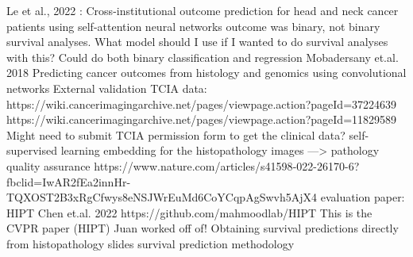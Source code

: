 \documentclass{article}%
\begin{document}
%
Le et al., 2022 : Cross{-}institutional outcome prediction for head and neck cancer patients using self{-}attention neural networks%
\newline%
\newline%
%
outcome was binary, not binary survival analyses. What model should I use if I wanted to do survival analyses with this? Could do both binary classification and regression%
\newline%
\newline%
%
Mobadersany et.al. 2018 Predicting cancer outcomes from histology and genomics using convolutional networks%
\newline%
\newline%
%
External validation TCIA data:%
\newline%
\newline%
%
https://wiki.cancerimagingarchive.net/pages/viewpage.action?pageId=37224639%
\newline%
\newline%
%
https://wiki.cancerimagingarchive.net/pages/viewpage.action?pageId=11829589%
\newline%
\newline%
%
Might need to submit TCIA permission form to get the clinical data?%
\newline%
\newline%
%
self{-}supervised learning embedding for the histopathology images —> pathology quality assurance%
\newline%
\newline%
%
https://www.nature.com/articles/s41598{-}022{-}26170{-}6?fbclid=IwAR2fEa2innHr{-}TQXOST2B3xRgCfwys8eNSJWrEuMd6CoYCqpAgSwvh5AjX4%
\newline%
\newline%
%
evaluation paper:%
\newline%
\newline%
%
HIPT Chen et.al. 2022 %
\newline%
\newline%
%
https://github.com/mahmoodlab/HIPT%
\newline%
\newline%
%
This is the CVPR paper (HIPT) Juan worked off of!%
\newline%
\newline%
%
Obtaining survival predictions directly from histopathology slides%
\newline%
\newline%
%
survival prediction methodology%
\newline%
\end{document}
